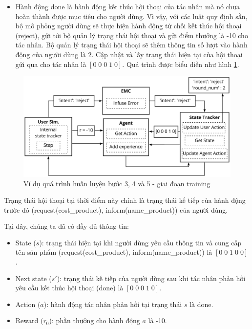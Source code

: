 \begin{itemize}
    \item Hành động done là hành động kết thúc hội thoại của tác nhân
    mà nó chưa hoàn thành được mục tiêu cho người dùng. Vì vậy,
    với các luật quy định sẵn, bộ mô phỏng người dùng sẽ thực hiện
    hành động từ chối kết thúc hội thoại (reject), gửi tới bộ quản lý
    trạng thái hội thoại và gửi điểm thưởng là -10 cho tác nhân.
    Bộ quản lý trạng thái hội thoại sẽ thêm thông tin số lượt vào
    hành động của người dùng là 2. Cập nhật và lấy trạng thái hiện tại
    của hội thoại gửi qua cho tác nhân là $[0\; 0\; 0\; 1\; 0]$.
    Quá trình được biểu diễn như hình \ref{fig:examtraining2}.
\end{itemize}

\begin{figure}[ht!]
    \centering
    \includegraphics[scale=0.15]{thesis/chatbot/phuongphap/img/training_exam2.jpg}
    \caption{Ví dụ quá trình huấn luyện bước 3, 4 và 5 - giai đoạn training}
    \label{fig:examtraining2}
\end{figure}

Trạng thái hội thoại tại thời điểm này chính là trạng thái kế tiếp
của hành động trước đó (request(cost\_product),
inform(name\_product)) của người dùng.

Tại đây, chúng ta đã có đầy đủ thông tin:
\begin{itemize}
    \item State ($s$): trạng thái hiện tại khi người dùng yêu cầu
    thông tin và cung cấp tên sản phẩm (request(cost\_product),
    inform(name\_product)) là $[0\; 0\; 1\; 0\; 0]$.
    \item Next state ($s'$): trạng thái kế tiếp của người dùng
    sau khi tác nhân phản hồi yêu cầu kết thúc hội thoại (done)
    là $[0\; 0\; 0\; 1\; 0]$.
    \item Action ($a$): hành động tác nhân phản hồi tại
    trạng thái $s$ là done.
    \item Reward ($r_0$): phần thưởng cho hành động $a$ là -10.
\end{itemize}

